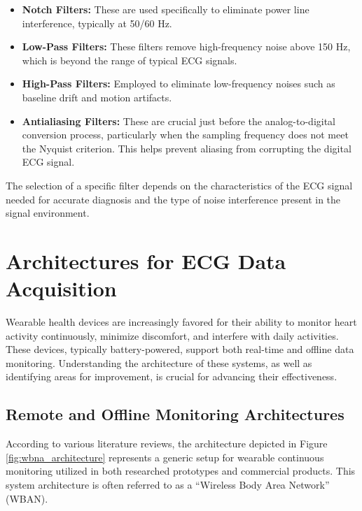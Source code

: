 \begin{itemize}
	\item \textbf{Notch Filters:} These are used specifically to eliminate power line interference, typically at 50/60 Hz.
	\item \textbf{Low-Pass Filters:} These filters remove high-frequency noise above 150 Hz, which is beyond the range of typical ECG signals.
	\item \textbf{High-Pass Filters:} Employed to eliminate low-frequency noises such as baseline drift and motion artifacts.
	\item \textbf{Antialiasing Filters:} These are crucial just before the analog-to-digital conversion process, particularly when the sampling frequency does not meet the Nyquist criterion. This helps prevent aliasing from corrupting the digital ECG signal.
\end{itemize}

\noindent The selection of a specific filter depends on the characteristics of the ECG signal needed for accurate diagnosis and the type of noise interference present in the signal environment.\\

\section{Architectures for ECG Data Acquisition}
\vspace{1em}
\noindent Wearable health devices are increasingly favored for their ability to monitor heart activity continuously, minimize discomfort, and interfere with daily activities. These devices, typically battery-powered, support both real-time and offline data monitoring. Understanding the architecture of these systems, as well as identifying areas for improvement, is crucial for advancing their effectiveness.

\subsection{Remote and Offline Monitoring Architectures}
\vspace{1em}
\noindent According to various literature reviews, the architecture depicted in Figure \ref{fig:wbna_architecture} represents a generic setup for wearable continuous monitoring utilized in both researched prototypes and commercial products. This system architecture is often referred to as a “Wireless Body Area Network” (WBAN).

